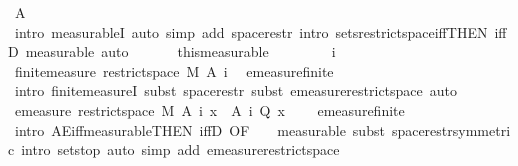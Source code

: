 \begin{isabellebody}
\ A\ \isamarkupfalse%
\ {\isacharparenleft}{\kern0pt}intro\ measurableI{\isacharcomma}{\kern0pt}\ auto\ simp\ add{\isacharcolon}{\kern0pt}\ space{\isacharunderscore}{\kern0pt}restr\ intro{\isacharbang}{\kern0pt}{\isacharcolon}{\kern0pt}\ sets{\isacharunderscore}{\kern0pt}restrict{\isacharunderscore}{\kern0pt}space{\isacharunderscore}{\kern0pt}iff{\isacharbrackleft}{\kern0pt}THEN\ iffD{}{\isacharbrackright}{\kern0pt}{\isacharcomma}{\kern0pt}\ measurable{\isacharcomma}{\kern0pt}\ auto{\isacharparenright}{\kern0pt}\isanewline
\ \ \isacommand{{\isacharbraceright}{\kern0pt}}\isamarkupfalse%
\isanewline
\ \ \isamarkupfalse%
\ this{\isacharbrackleft}{\kern0pt}measurable{\isacharbrackright}{\kern0pt}\isanewline
\ \ \isacommand{{\isacharbraceleft}{\kern0pt}}\isamarkupfalse%
\isanewline
\ \ \ \ \isamarkupfalse%
\ i\isanewline
\ \ \ \ \isamarkupfalse%
\ {\isachardoublequoteopen}finite{\isacharunderscore}{\kern0pt}measure\ {\isacharparenleft}{\kern0pt}restrict{\isacharunderscore}{\kern0pt}space\ M\ {\isacharparenleft}{\kern0pt}A\ i{\isacharparenright}{\kern0pt}{\isacharparenright}{\kern0pt}{\isachardoublequoteclose}\ \isamarkupfalse%
\ emeasure{\isacharunderscore}{\kern0pt}finite\ \isamarkupfalse%
\ {\isacharparenleft}{\kern0pt}intro\ finite{\isacharunderscore}{\kern0pt}measureI{\isacharcomma}{\kern0pt}\ subst\ space{\isacharunderscore}{\kern0pt}restr{\isacharcomma}{\kern0pt}\ subst\ emeasure{\isacharunderscore}{\kern0pt}restrict{\isacharunderscore}{\kern0pt}space{\isacharcomma}{\kern0pt}\ auto{\isacharparenright}{\kern0pt}\isanewline
\ \ \ \ \isamarkupfalse%
\ {\isachardoublequoteopen}emeasure\ {\isacharparenleft}{\kern0pt}restrict{\isacharunderscore}{\kern0pt}space\ M\ {\isacharparenleft}{\kern0pt}A\ i{\isacharparenright}{\kern0pt}{\isacharparenright}{\kern0pt}\ {\isacharbraceleft}{\kern0pt}x\ {\isasymin}\ A\ i{\isachardot}{\kern0pt}\ {\isasymnot}Q\ x{\isacharbraceright}{\kern0pt}\ {\isacharequal}{\kern0pt}\ {}{\isachardoublequoteclose}\ \isamarkupfalse%
\ emeasure{\isacharunderscore}{\kern0pt}finite\ \isamarkupfalse%
\ {\isacharparenleft}{\kern0pt}intro\ AE{\isacharunderscore}{\kern0pt}iff{\isacharunderscore}{\kern0pt}measurable{\isacharbrackleft}{\kern0pt}THEN\ iffD{}{\isacharcomma}{\kern0pt}\ OF\ {\isacharunderscore}{\kern0pt}\ {\isacharunderscore}{\kern0pt}\ {\isacharasterisk}{\kern0pt}{\isacharbrackright}{\kern0pt}{\isacharcomma}{\kern0pt}\ measurable{\isacharcomma}{\kern0pt}\ subst\ space{\isacharunderscore}{\kern0pt}restr{\isacharbrackleft}{\kern0pt}symmetric{\isacharbrackright}{\kern0pt}{\isacharcomma}{\kern0pt}\ intro\ sets{\isachardot}{\kern0pt}top{\isacharcomma}{\kern0pt}\ auto\ simp\ add{\isacharcolon}{\kern0pt}\ emeasure{\isacharunderscore}{\kern0pt}restrict{\isacharunderscore}{\kern0pt}space{\isacharparenright}{\kern0pt}\isanewline

\end{isabellebody}
